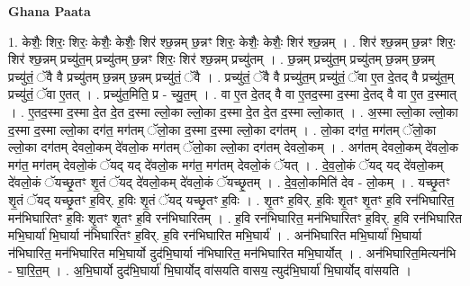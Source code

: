 \documentclass[17pt]{extarticle}
\begin{document}
\textbf{Ghana Paata } \newline

1. केशैः॒ शिरः॒ शिरः॒ केशैः॒ केशैः॒ शिर॑ श्छ॒न्नम् छ॒न्नꣳ शिरः॒ केशैः॒ केशैः॒ शिर॑ श्छ॒न्नम् । . शिर॑ श्छ॒न्नम् छ॒न्नꣳ शिरः॒ शिर॑ श्छ॒न्नम् प्रच्यु॑त॒म् प्रच्यु॑तम् छ॒न्नꣳ शिरः॒ शिर॑ श्छ॒न्नम् प्रच्यु॑तम् । . छ॒न्नम् प्रच्यु॑त॒म् प्रच्यु॑तम् छ॒न्नम् छ॒न्नम् प्रच्यु॑तं॒ ॅवै वै प्रच्यु॑तम् छ॒न्नम् छ॒न्नम् प्रच्यु॑तं॒ ॅवै । . प्रच्यु॑तं॒ ॅवै वै प्रच्यु॑त॒म् प्रच्यु॑तं॒ ॅवा ए॒त दे॒तद् वै प्रच्यु॑त॒म् प्रच्यु॑तं॒ ॅवा ए॒तत् । . प्रच्यु॑त॒मिति॒ प्र - च्यु॒त॒म् । . वा ए॒त दे॒तद् वै वा ए॒तद॒स्मा द॒स्मा दे॒तद् वै वा ए॒त द॒स्मात् । . ए॒तद॒स्मा द॒स्मा दे॒त दे॒त द॒स्मा ल्लो॒का ल्लो॒का द॒स्मा दे॒त दे॒त द॒स्मा ल्लो॒कात् । . अ॒स्मा ल्लो॒का ल्लो॒का द॒स्मा द॒स्मा ल्लो॒का दग॑त॒ मग॑तम् ॅलो॒का द॒स्मा द॒स्मा ल्लो॒का दग॑तम् । . लो॒का दग॑त॒ मग॑तम् ॅलो॒का ल्लो॒का दग॑तम् देवलो॒कम् दे॑वलो॒क मग॑तम् ॅलो॒का ल्लो॒का दग॑तम् देवलो॒कम् । . अग॑तम् देवलो॒कम् दे॑वलो॒क मग॑त॒ मग॑तम् देवलो॒कं ॅयद् यद् दे॑वलो॒क मग॑त॒ मग॑तम् देवलो॒कं ॅयत् । . दे॒व॒लो॒कं ॅयद् यद् दे॑वलो॒कम् दे॑वलो॒कं ॅयच्छृ॒तꣳ शृ॒तं ॅयद् दे॑वलो॒कम् दे॑वलो॒कं ॅयच्छृ॒तम् । . दे॒व॒लो॒कमिति॑ देव - लो॒कम् । . यच्छृ॒तꣳ शृ॒तं ॅयद् यच्छृ॒तꣳ ह॒विर्. ह॒विः शृ॒तं ॅयद् यच्छृ॒तꣳ ह॒विः । . शृ॒तꣳ ह॒विर्. ह॒विः शृ॒तꣳ शृ॒तꣳ ह॒वि रन॑भिघारित॒ मन॑भिघारितꣳ ह॒विः शृ॒तꣳ शृ॒तꣳ ह॒वि रन॑भिघारितम् । . ह॒वि रन॑भिघारित॒ मन॑भिघारितꣳ ह॒विर्. ह॒वि रन॑भिघारित मभि॒घार्या॑ भि॒घार्या न॑भिघारितꣳ ह॒विर्. ह॒वि रन॑भिघारित मभि॒घार्य॑ । . अन॑भिघारित मभि॒घार्या॑ भि॒घार्या न॑भिघारित॒ मन॑भिघारित मभि॒घार्यो दुद॑भि॒घार्या न॑भिघारित॒ मन॑भिघारित मभि॒घार्योत् । . अन॑भिघारित॒मित्यन॑भि - घा॒रि॒त॒म् । . अ॒भि॒घार्यो दुद॑भि॒घार्या॑ भि॒घार्योद् वा॑सयति वासय॒ त्युद॑भि॒घार्या॑ भि॒घार्योद् वा॑सयति । \newline
\end{document}
